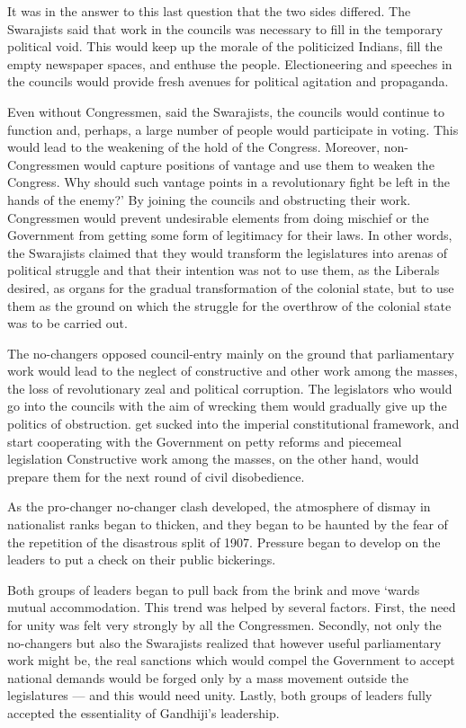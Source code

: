 It was in the answer to this last question that the two sides differed. The Swarajists said that work in the councils was necessary to fill in the temporary political void. This would keep up the morale of the politicized Indians, fill the empty newspaper spaces, and enthuse the people. Electioneering and speeches in the councils would provide fresh avenues for political agitation and propaganda.

Even without Congressmen, said the Swarajists, the councils would continue to function and, perhaps, a large number of people would participate in voting. This would lead to the weakening of the hold of the Congress. Moreover, non- Congressmen would capture positions of vantage and use them to weaken the Congress. Why should such vantage points in a revolutionary fight be left in the hands of the enemy?' By joining the councils and obstructing their work. Congressmen would prevent undesirable elements from doing mischief or the Government from getting some form of legitimacy for their laws. In other words, the Swarajists claimed that they would transform the legislatures into arenas of political struggle and that their intention was not to use them, as the Liberals desired, as organs for the gradual transformation of the colonial state, but to use them as the ground on which the struggle for the overthrow of the colonial state was to be carried out.

The no-changers opposed council-entry mainly on the ground that parliamentary work would lead to the neglect of constructive and other work among the masses, the loss of revolutionary zeal and political corruption. The legislators who would go into the councils with the aim of wrecking them would gradually give up the politics of obstruction. get sucked into the imperial constitutional framework, and start cooperating with the Government on petty reforms and piecemeal legislation Constructive work among the masses, on the other hand, would prepare them for the next round of civil disobedience.

As the pro-changer no-changer clash developed, the atmosphere of dismay in nationalist ranks began to thicken, and they began to be haunted by the fear of the repetition of the disastrous split of 1907. Pressure began to develop on the leaders to put a check on their public bickerings.

Both groups of leaders began to pull back from the brink and move `wards mutual accommodation. This trend was helped by several factors. First, the need for unity was felt very strongly by all the Congressmen. Secondly, not only the no-changers but also the Swarajists realized that however useful parliamentary work might be, the real sanctions which would compel the Government to accept national demands would be forged only by a mass movement outside the legislatures — and this would need unity. Lastly, both groups of leaders fully accepted the essentiality of Gandhiji's leadership.

